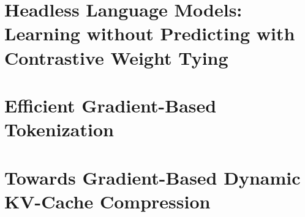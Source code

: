 \chapter{Headless Language Models: Learning without Predicting with Contrastive Weight Tying}
\label{chap:headless_lm}


\chapter{Efficient Gradient-Based Tokenization}
\label{chap:manta}


\chapter{Towards Gradient-Based Dynamic KV-Cache Compression}
\label{chap:kv_comp}

